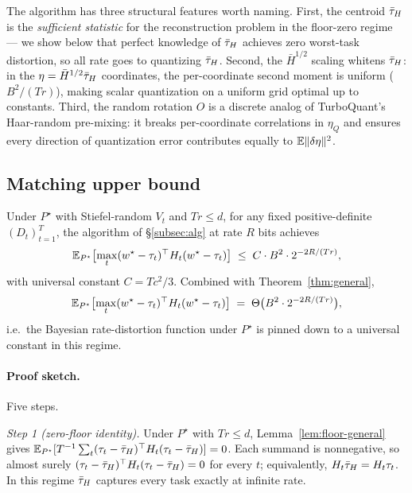 The algorithm has three structural features worth naming. First,
the centroid $\bar{\tau}_H$ is the \emph{sufficient statistic} for the
reconstruction problem in the floor-zero regime — we show below
that perfect knowledge of $\bar{\tau}_H$ achieves zero worst-task
distortion, so all rate goes to quantizing $\bar{\tau}_H$. Second, the
$\bar H^{1/2}$ scaling whitens $\bar{\tau}_H$: in the $\eta = \bar H^{1/2}
\bar{\tau}_H$ coordinates, the per-coordinate second moment is uniform
($B^2/(Tr)$), making scalar quantization on a uniform grid
optimal up to constants. Third, the random rotation $O$ is a
discrete analog of TurboQuant's Haar-random pre-mixing: it
breaks per-coordinate correlations in $\eta_Q$ and ensures every
direction of quantization error contributes equally to
$\mathbb{E}\|\delta\eta\|^2$.

\subsection{Matching upper bound}\label{subsec:match}

\begin{theorem}
\label{thm:achv}
Under $P^\star$ with Stiefel-random $V_t$ and $Tr\leq d$, for
any fixed positive-definite $(D_t)_{t=1}^T$, the algorithm of
\S\ref{subsec:alg} at rate $R$ bits achieves
\begin{equation}\label{eq:thm-ub}
  \mathbb{E}_{P^\star}\bigl[\max_t(w^\star-\tau_t)^\top H_t(w^\star-
  \tau_t)\bigr]
  \;\leq\; C\cdot B^2 \cdot 2^{-2R/(Tr)},
\end{equation}
with universal constant $C = T c^2 / 3$. Combined with
Theorem~\ref{thm:general},
\begin{equation*}
  \mathbb{E}_{P^\star}\bigl[\max_t(w^\star-\tau_t)^\top H_t(w^\star-
  \tau_t)\bigr] \;=\; \Theta\bigl(B^2\cdot 2^{-2R/(Tr)}\bigr),
\end{equation*}
i.e.\ the Bayesian rate-distortion function under $P^\star$ is
pinned down to a universal constant in this regime.
\end{theorem}

\paragraph{Proof sketch.} Five steps.

\emph{Step 1 (zero-floor identity).} Under $P^\star$ with
$Tr\leq d$, Lemma~\ref{lem:floor-general} gives
$\mathbb{E}_{P^\star}[T^{-1}\sum_t(\tau_t-\bar{\tau}_H)^\top H_t(\tau_t-\bar{\tau}_H)]
= 0$. Each summand is nonnegative, so almost surely
$(\tau_t - \bar{\tau}_H)^\top H_t(\tau_t-\bar{\tau}_H) = 0$ for every $t$;
equivalently, $H_t\bar{\tau}_H = H_t\tau_t$. In this regime $\bar{\tau}_H$
captures every task exactly at infinite rate.

